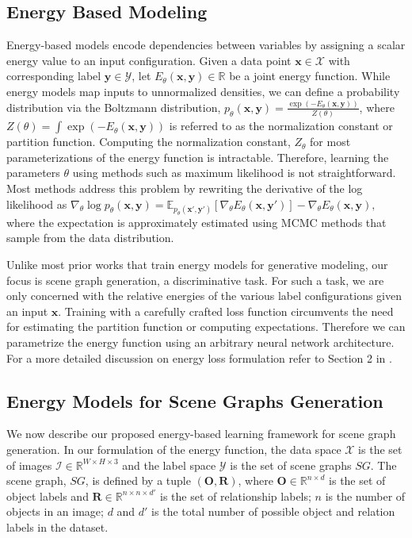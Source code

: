 \documentclass[final]{cvpr}
\newcommand{\imagerep}{\mathcal{I}}
\newcommand{\objectlabelrepeq}{\mathbf{O}}
\newcommand{\relationlabelrepeq}{\mathbf{R}}
\begin{document}
\subsection{Energy Based Modeling}
Energy-based models \cite{lecun2006tutorial} encode dependencies between variables by assigning a scalar energy value to an input configuration. Given a data point $\mathbf{x} \in \mathcal{X}$ with corresponding label $\mathbf{y} \in \mathcal{Y}$, let $E_{\theta}(\mathbf{x},\mathbf{y}) \in \mathbb{R}$ be a joint energy function. While energy models map inputs to unnormalized densities, we can define a probability distribution via the Boltzmann distribution, $ p_{\theta}(\mathbf{x},\mathbf{y}) = \frac{\exp(-E_{\theta}(\mathbf{x},\mathbf{y}))}{Z(\theta)}$, where $Z(\theta) = \int \exp(-E_{\theta}(\mathbf{x},\mathbf{y}))$ is referred to as the normalization constant or partition function. Computing the normalization constant, $Z_{\theta}$ for most parameterizations of the energy function is intractable. Therefore, learning the parameters $\theta$ using methods such as maximum likelihood is not straightforward. Most methods address this problem by rewriting the derivative of the log likelihood as $\nabla_{\theta} \log p_{\theta}(\mathbf{x}, \mathbf{y}) = \mathbb{E}_{p_{\theta}(\mathbf{x'},\mathbf{y'})} [ \nabla_{\theta} E_{\theta} (\mathbf{x}, \mathbf{y'})] - \nabla_{\theta} E_{\theta}(\mathbf{x}, \mathbf{y}),$
where the expectation is approximately estimated using MCMC methods that sample from the data distribution. 

Unlike most prior works that train energy models for generative modeling, our focus is scene graph generation, a discriminative task. For such a task, we are only concerned with the relative energies of the various label configurations given an input $\mathbf{x}$. Training with a carefully crafted loss function circumvents the need for estimating the partition function or computing expectations. Therefore we can parametrize the energy function using an arbitrary neural network architecture. For a more detailed discussion on energy loss formulation refer to Section 2 in \cite{lecun2005loss}. 


\subsection{Energy Models for Scene Graphs Generation}
We now describe our proposed energy-based learning framework for scene graph generation. In our formulation of the energy function, the data space $\mathcal{X}$ is the set of images $\imagerep \in \mathbb{R}^{W \times H \times 3}$ and the label space $\mathcal{Y}$ is the set of scene graphs $SG$. 
The scene graph, $SG$, is defined by a tuple  $(\objectlabelrepeq,\relationlabelrepeq)$, where $\objectlabelrepeq \in \mathbb{R}^{n \times d}$ is the set of object labels and $\relationlabelrepeq \in \mathbb{R}^{n \times n \times d'}$ is the set of relationship labels; $n$ is the number of objects in an image; $d$ and $d'$ is the total number of possible object and relation labels in the dataset. 
\end{document}

